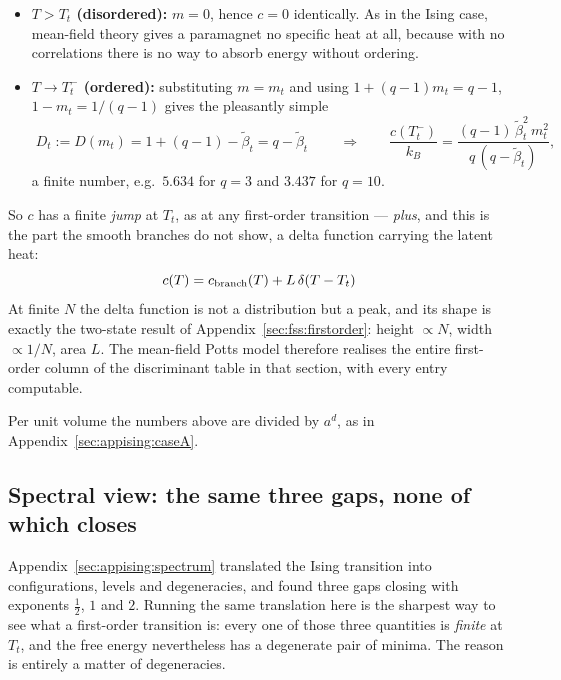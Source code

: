 \documentclass[10pt,a4paper]{article}
\theoremstyle{remark}
\begin{document}
\begin{itemize}
\item \textbf{$T>T_t$ (disordered):} $m=0$, hence $c=0$ identically. As in the
Ising case, mean-field theory gives a paramagnet no specific heat at all, because
with no correlations there is no way to absorb energy without ordering.
\item \textbf{$T\to T_t^{-}$ (ordered):} substituting $m=m_t$ and using
$1+(q-1)m_t=q-1$, $1-m_t=1/(q-1)$ gives the pleasantly simple
\[
\;D_t:= D(m_t)=1+(q-1)-\tilde\beta_t=q-\tilde\beta_t\
\qquad\Longrightarrow\qquad
\frac{c(T_t^{-})}{k_B}=\frac{(q-1)\,\tilde\beta_t^{2}\,m_t^{2}}{q\,(q-\tilde\beta_t)} ,
\]
a finite number, e.g.\ $5.634$ for $q=3$ and $3.437$ for $q=10$.
\end{itemize}
So $c$ has a finite \emph{jump} at $T_t$, as at any first-order transition ---
\emph{plus}, and this is the part the smooth branches do not show, a delta
function carrying the latent heat:
\[
\;
c(T)=c_{\rm branch}(T)+L\,\delta(T-T_t)\
\]
At finite $N$ the delta function is not a distribution but a peak, and its shape
is exactly the two-state result of Appendix~\ref{sec:fss:firstorder}: height
$\propto N$, width $\propto 1/N$, area $L$. The mean-field Potts model therefore
realises the entire first-order column of the discriminant table in that section,
with every entry computable.

Per unit volume the numbers above are divided by $a^{d}$, as in
Appendix~\ref{sec:appising:caseA}.

\subsection{Spectral view: the same three gaps, none of which closes}
\label{sec:apppotts:spectrum}

Appendix~\ref{sec:appising:spectrum} translated the Ising transition into
configurations, levels and degeneracies, and found three gaps closing with
exponents $\tfrac12$, $1$ and $2$. Running the same translation here is the
sharpest way to see what a first-order transition is: every one of those three
quantities is \emph{finite} at $T_t$, and the free energy nevertheless has a
degenerate pair of minima. The reason is entirely a matter of degeneracies.
\end{document}
